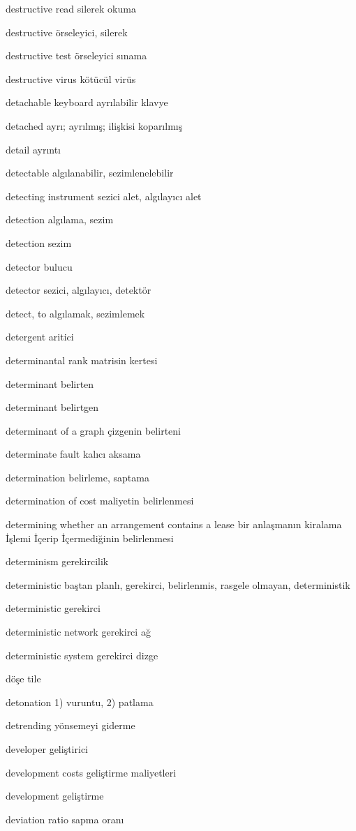 \documentclass[12pt,fleqn]{article}\usepackage{../../common}
\begin{document}
destructive read silerek okuma

destructive örseleyici, silerek

destructive test örseleyici sınama

destructive virus kötücül virüs

detachable keyboard ayrılabilir klavye

detached ayrı; ayrılmış; ilişkisi koparılmış

detail ayrıntı

detectable algılanabilir, sezimlenelebilir

detecting instrument sezici alet, algılayıcı alet

detection algılama, sezim

detection sezim

detector bulucu

detector sezici, algılayıcı, detektör

detect, to algılamak, sezimlemek

detergent aritici

determinantal rank matrisin kertesi

determinant belirten

determinant belirtgen

determinant of a graph çizgenin belirteni

determinate fault kalıcı aksama

determination belirleme, saptama

determination of cost maliyetin belirlenmesi

determining whether an arrangement contains a lease bir anlaşmanın kiralama İşlemi İçerip İçermediğinin belirlenmesi

determinism gerekircilik

deterministic baştan planlı, gerekirci, belirlenmis, rasgele olmayan, deterministik

deterministic gerekirci

deterministic network gerekirci ağ

deterministic system gerekirci dizge

döşe tile

detonation 1) vuruntu, 2) patlama

detrending yönsemeyi giderme

developer geliştirici

development costs geliştirme maliyetleri

development geliştirme

deviation ratio sapma oranı
\end{document}

